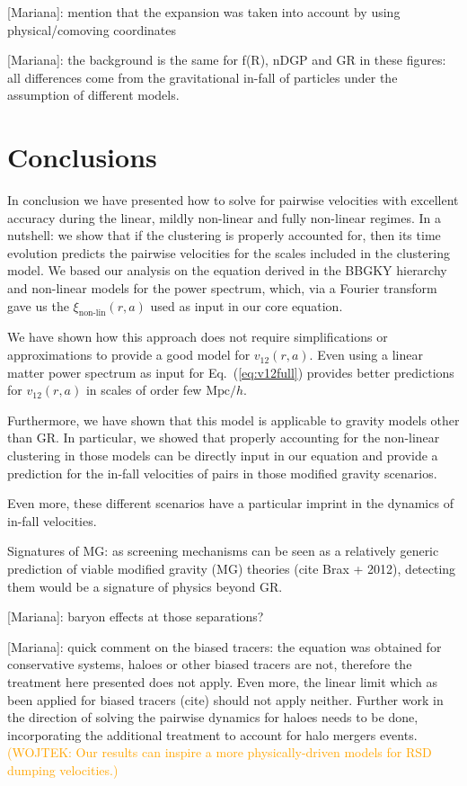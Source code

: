 \documentclass[%
 reprint,
groupedaddress,
nofootinbib,
nobibnotes,
 amsmath,amssymb,
 aps,
]{revtex4-2}
\newcommand{\refeq}[1]{Eq.~(\ref{eq:#1})}
\newcommand{\pairvel}{$v_{12}(r,a)$}
\newcommand{\MpchInv}{$\mbox{Mpc}/h$}
\newcommand{\<}{\langle}
\renewcommand{\>}{\rangle}
\newcommand{\WH}[1]{\textcolor{orange}{(WOJTEK: #1)}}
\newcommand{\MJ}[1]{\textcolor{WildStrawberry}{[Mariana]: #1}}
\begin{document}
\MJ{mention that the expansion was taken into account by using physical/comoving coordinates}

\MJ{the background is the same for f(R), nDGP and GR in these figures: all differences come from the gravitational in-fall of particles under the assumption of different models.}


\section{\label{sec:conclusions}Conclusions}

In conclusion we have presented how to solve for pairwise velocities with excellent accuracy during the linear, mildly non-linear and fully non-linear regimes. In a nutshell: we show that if the clustering is properly accounted for, then its time evolution predicts the pairwise velocities for the scales included in the clustering model. We based our analysis on the equation derived in the BBGKY hierarchy and non-linear models for the power spectrum, which, via a Fourier transform gave us the $\xi_{\text{non-lin}}(r,a)$ used as input in our core equation. 

We have shown how this approach does not require simplifications or approximations to provide a good model for \pairvel{}. Even using a linear matter power spectrum as input for \refeq{v12full} provides better predictions for \pairvel{} in scales of order few \MpchInv. 

Furthermore, we have shown that this model is applicable to gravity models other than GR. In particular, we showed that properly accounting for the non-linear clustering in those models can be directly input in our equation and provide a prediction for the in-fall velocities of pairs in those modified gravity scenarios.

Even more, these different scenarios have a particular imprint in the dynamics of in-fall velocities. 
 
Signatures of MG: as screening mechanisms can be seen as a relatively generic prediction of
viable modified gravity (MG) theories (cite Brax + 2012), detecting them would be a signature of physics beyond GR. 

\MJ{baryon effects at those separations? }

\MJ{quick comment on the biased tracers: the equation was obtained for conservative systems, haloes or other biased tracers are not, therefore the treatment here presented does not apply. Even more, the linear limit which as been applied for biased tracers (cite) should not apply neither. Further work in the direction of solving the pairwise dynamics for haloes needs to be done, incorporating the additional treatment to account for halo mergers events.  }
\WH{Our results can inspire a more physically-driven models for RSD dumping velocities.}
\end{document}
